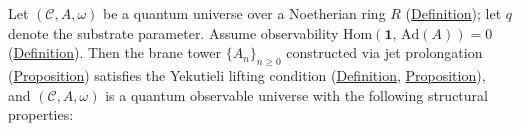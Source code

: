 \begin{theorem}
  \label{thm:qu-to-qou}
Let $(\mathcal{C}, A, \omega)$ be a quantum universe over a Noetherian
ring $R$ (\hyperref[def:quantum-universe]{Definition}); let $q$ denote the substrate parameter.  Assume observability
$\mathrm{Hom}(\mathbf{1},\, \mathrm{Ad}(A)) = 0$
(\hyperref[def:quantum-observable-universe]{Definition}).  Then the brane tower
$\{A_n\}_{n \geq 0}$ constructed via jet prolongation
(\hyperref[prop:jet-prolongation]{Proposition}) satisfies the Yekutieli lifting
condition (\hyperref[def:yekutieli-lifting-condition]{Definition},
\hyperref[prop:yekutieli-lifting]{Proposition}), and $(\mathcal{C}, A, \omega)$
is a quantum observable universe with the following structural properties:


\end{theorem}
